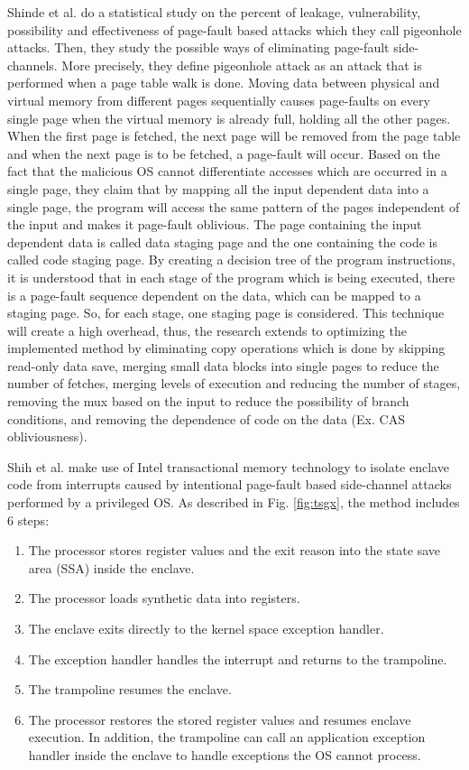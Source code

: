 Shinde et al. \cite{pigeonhole} do a statistical study on the percent of leakage, vulnerability, possibility and effectiveness of page-fault based attacks which they call pigeonhole attacks. Then, they study the possible ways of eliminating page-fault side-channels. More precisely, they define pigeonhole attack as an attack that is performed when a page table walk is done. Moving data between physical and virtual memory from different pages sequentially causes page-faults on every single page when the virtual memory is already full, holding all the other pages. When the first page is fetched, the next page will be removed from the page table and when the next page is to be fetched, a page-fault will occur. Based on the fact that the malicious OS cannot differentiate accesses which are occurred in a single page, they claim that by mapping all the input dependent data into a single page, the program will access the same pattern of the pages independent of the input and makes it page-fault oblivious. The page containing the input dependent data is called data staging page and the one containing the code is called code staging page. By creating a decision tree of the program instructions, it is understood that in each stage of the program which is being executed, there is a page-fault sequence dependent on the data, which can be mapped to a staging page. So, for each stage, one staging page is considered. This technique will create a high overhead, thus, the research extends to optimizing the implemented method by eliminating copy operations which is done by skipping read-only data save, merging small data blocks into single pages to reduce the number of fetches, merging levels of execution and reducing the number of stages, removing the mux based on the input to reduce the possibility of branch conditions, and removing the dependence of code on the data (Ex. CAS obliviousness).

Shih et al. \cite{tsgx} make use of Intel transactional memory technology to isolate enclave code from interrupts caused by intentional page-fault based side-channel attacks performed by a privileged OS. As described in Fig. \ref{fig:tsgx}, the method includes 6 steps:
\begin{enumerate}
	\item The processor stores register values and the exit reason into the state save area (SSA) inside the enclave.
	\item The processor loads synthetic	data into registers.
	\item The enclave exits directly to the kernel space exception handler.
	\item The exception handler handles the interrupt and returns to the trampoline.
	\item The trampoline resumes the enclave.
	\item The processor restores the stored register values and resumes enclave execution. In addition, the trampoline can call an application exception handler inside the enclave to handle exceptions the OS cannot process.
\end{enumerate}


